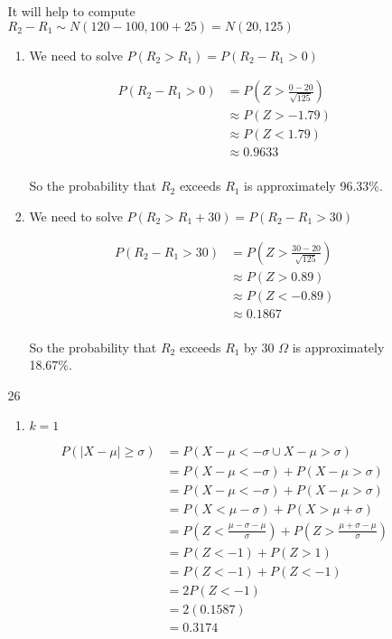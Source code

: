 \documentclass[12pt,letterpaper]{article}
\begin{document}
\begin{enumerate}
\begin{enumerate}
          It will help to compute $R_2 - R_1 \sim N(120 - 100, 100 + 25) = N(20, 125)$
          \begin{enumerate}[label=(\arabic*)]
            \item
              We need to solve $P(R_2 > R_1) = P(R_2 - R_1 > 0)$

              \begin{align*}
                P(R_2 - R_1 > 0) &= P\left(Z > \frac{0 - 20}{\sqrt{125}}\right) \\
                &\approx P\left(Z > -1.79\right) \\
                &\approx P\left(Z < 1.79\right) \\
                &\approx 0.9633 \\
              \end{align*}

              So the probability that $R_2$ exceeds $R_1$ is approximately 96.33\%.
            \item
              We need to solve $P(R_2 > R_1 + 30) = P(R_2 - R_1 > 30)$

              \begin{align*}
                P(R_2 - R_1 > 30) &= P\left(Z > \frac{30 - 20}{\sqrt{125}}\right) \\
                &\approx P\left(Z > 0.89\right) \\
                &\approx P\left(Z < -0.89\right) \\
                &\approx 0.1867 \\
              \end{align*}

              So the probability that $R_2$ exceeds $R_1$ by 30 $\Omega$ is approximately 18.67\%.
          \end{enumerate}
        \item [26]
          \begin{enumerate}
            \item $k = 1$

              \begin{align*}
                P(|X - \mu| \ge \sigma) &= P(X - \mu < -\sigma \cup X - \mu > \sigma) \\
                &= P(X - \mu < -\sigma) + P(X - \mu > \sigma) \\
                &= P(X - \mu < -\sigma) + P(X - \mu > \sigma) \\
                &= P(X < \mu - \sigma) + P(X > \mu + \sigma) \\
                &= P\left(Z < \frac{\mu - \sigma - \mu}{\sigma}\right) + P\left(Z > \frac{\mu + \sigma - \mu}{\sigma}\right) \\
                &= P(Z < -1) + P(Z > 1) \\
                &= P(Z < -1) + P(Z < -1) \\
                &= 2P(Z < -1) \\
                &= 2(0.1587) \\
                &= 0.3174 \\
              \end{align*}


\end{enumerate}
\end{enumerate}
\end{enumerate}
\end{document}
